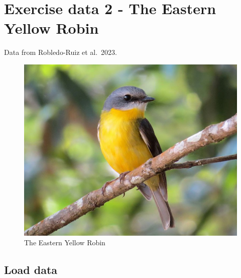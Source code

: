 \documentclass[
  letterpaper,
  DIV=11,
  numbers=noendperiod]{scrreprt}
\newenvironment{Shaded}{\begin{snugshade}}{\end{snugshade}}
\newcommand{\AttributeTok}[1]{\textcolor[rgb]{0.49,0.56,0.16}{#1}}
\newcommand{\FunctionTok}[1]{\textcolor[rgb]{0.02,0.16,0.49}{#1}}
\newcommand{\NormalTok}[1]{\textcolor[rgb]{0.00,0.44,0.13}{#1}}
\newcommand{\SpecialCharTok}[1]{\textcolor[rgb]{0.25,0.44,0.63}{#1}}
\newcommand{\StringTok}[1]{\textcolor[rgb]{0.25,0.44,0.63}{#1}}
\begin{document}
\hypertarget{exercise-data-2---the-eastern-yellow-robin}{%
\section*{Exercise data 2 - The Eastern Yellow
Robin}\label{exercise-data-2---the-eastern-yellow-robin}}


Data from Robledo-Ruiz et al.~2023.

\begin{figure}

{\centering \includegraphics{images/Eastern_Yellow_Robin.jpg}

}

\caption{The Eastern Yellow Robin}

\end{figure}

\hypertarget{load-data-2}{%
\subsection*{Load data}\label{load-data-2}}

\begin{Shaded}
\end{Shaded}
\end{document}
